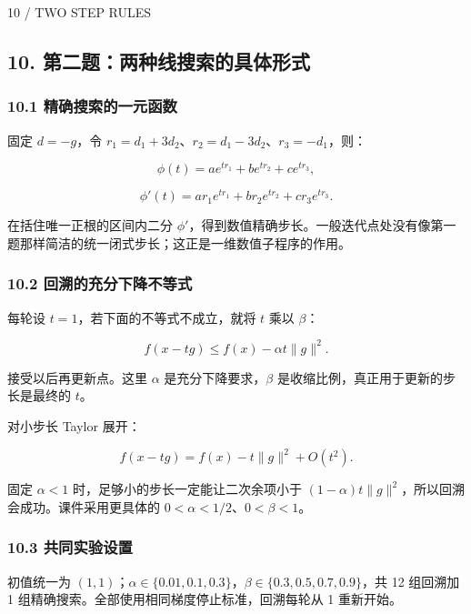 \documentclass[10pt,a4paper]{article}
\newcommand{\eyebrow}[1]{{\sffamily\fontsize{8.3}{12}\selectfont\color{navy}#1}\par\vspace{4pt}{\color{navy}\hrule height 1pt}\vspace{12pt}}
\begin{document}
\clearpage

\eyebrow{10 / TWO STEP RULES}

\subsection{10.
第二题：两种线搜索的具体形式}\label{ux7b2cux4e8cux9898ux4e24ux79cdux7ebfux641cux7d22ux7684ux5177ux4f53ux5f62ux5f0f}

\subsubsection{10.1
精确搜索的一元函数}\label{ux7cbeux786eux641cux7d22ux7684ux4e00ux5143ux51fdux6570}

固定 \(d=-g\)，令 \(r_1=d_1+3d_2\)、\(r_2=d_1-3d_2\)、\(r_3=-d_1\)，则：

\[\phi(t)=ae^{tr_1}+be^{tr_2}+ce^{tr_3},\]

\[\phi'(t)=ar_1e^{tr_1}+br_2e^{tr_2}+cr_3e^{tr_3}.\]

在括住唯一正根的区间内二分
\(\phi'\)，得到数值精确步长。一般迭代点处没有像第一题那样简洁的统一闭式步长；这正是一维数值子程序的作用。

\subsubsection{10.2
回溯的充分下降不等式}\label{ux56deux6eafux7684ux5145ux5206ux4e0bux964dux4e0dux7b49ux5f0f}

每轮设 \(t=1\)，若下面的不等式不成立，就将 \(t\) 乘以 \(\beta\)：

\[\boxed{f(x-tg)\le f(x)-\alpha t\|g\|^2.}\]

接受以后再更新点。这里 \(\alpha\) 是充分下降要求，\(\beta\)
是收缩比例，真正用于更新的步长是最终的 \(t\)。

对小步长 Taylor 展开：

\[f(x-tg)=f(x)-t\|g\|^2+O(t^2).\]

固定 \(\alpha<1\) 时，足够小的步长一定能让二次余项小于
\((1-\alpha)t\|g\|^2\)，所以回溯会成功。课件采用更具体的
\(0<\alpha<1/2\)、\(0<\beta<1\)。

\subsubsection{10.3
共同实验设置}\label{ux5171ux540cux5b9eux9a8cux8bbeux7f6e}

初值统一为
\((1,1)\)；\(\alpha\in\{0.01,0.1,0.3\}\)，\(\beta\in\{0.3,0.5,0.7,0.9\}\)，共
12 组回溯加 1 组精确搜索。全部使用相同梯度停止标准，回溯每轮从 1
重新开始。
\end{document}
